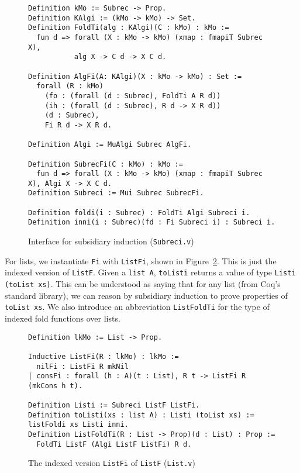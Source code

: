 \documentclass[a4paper,USenglish]{lipics-v2021}
\begin{document}
\begin{figure}
\begin{verbatim}
Definition kMo := Subrec -> Prop.
Definition KAlgi := (kMo -> kMo) -> Set.
Definition FoldTi(alg : KAlgi)(C : kMo) : kMo :=
  fun d => forall (X : kMo -> kMo) (xmap : fmapiT Subrec X), 
           alg X -> C d -> X C d.

Definition AlgFi(A: KAlgi)(X : kMo -> kMo) : Set :=
  forall (R : kMo)
    (fo : (forall (d : Subrec), FoldTi A R d))
    (ih : (forall (d : Subrec), R d -> X R d))
    (d : Subrec),
    Fi R d -> X R d.

Definition Algi := MuAlgi Subrec AlgFi.

Definition SubrecFi(C : kMo) : kMo := 
  fun d => forall (X : kMo -> kMo) (xmap : fmapiT Subrec X), Algi X -> X C d.
Definition Subreci := Mui Subrec SubrecFi.

Definition foldi(i : Subrec) : FoldTi Algi Subreci i.
Definition inni(i : Subrec)(fd : Fi Subreci i) : Subreci i.
\end{verbatim}
\caption{Interface for subsidiary induction (\texttt{Subreci.v})}
\label{fig:subreci}
\end{figure}

For lists, we instantiate \verb|Fi| with \verb|ListFi|, shown in
Figure~\ref{fig:listfi}.  This is just the indexed version of
\verb|ListF|.  Given a \verb|list A|, \verb|toListi| returns
a value of type \verb|Listi (toList xs)|.  This can be understood
as saying that for any list (from Coq's standard library),
we can reason by subsidiary induction to prove properties of \verb|toList xs|.
We also introduce an abbreviation \verb|ListFoldTi| for the type
of indexed fold functions over lists.

\begin{figure}
\begin{verbatim}
Definition lkMo := List -> Prop.

Inductive ListFi(R : lkMo) : lkMo :=
  nilFi : ListFi R mkNil
| consFi : forall (h : A)(t : List), R t -> ListFi R (mkCons h t).

Definition Listi := Subreci ListF ListFi.
Definition toListi(xs : list A) : Listi (toList xs) := listFoldi xs Listi inni.
Definition ListFoldTi(R : List -> Prop)(d : List) : Prop :=
  FoldTi ListF (Algi ListF ListFi) R d.
\end{verbatim}
\caption{The indexed version \texttt{ListFi} of \texttt{ListF} (\texttt{List.v})}
\label{fig:listfi}
\end{figure}
\end{document}
